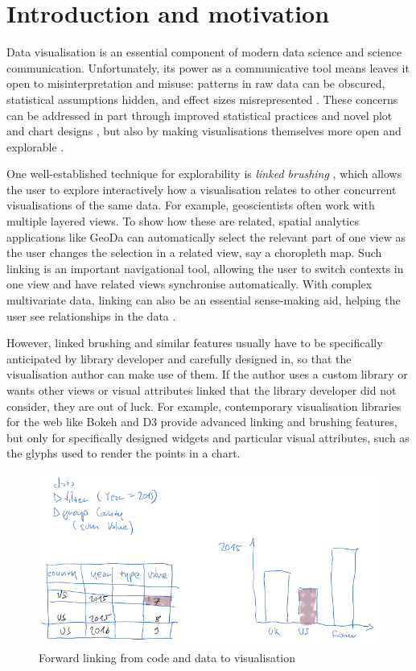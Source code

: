 \section{Introduction and motivation}

Data visualisation is an essential component of modern data science and science
communication. Unfortunately, its power as a communicative tool means leaves it
open to misinterpretation and misuse: patterns in raw data can be obscured,
statistical assumptions hidden, and effect sizes misrepresented
\cite{weissgerber15}. These concerns can be addressed in part through improved
statistical practices and novel plot and chart designs \cite{allen19}, but also
by making visualisations themselves more open and explorable
\cite{dragicevic19}.

One well-established technique for explorability is \emph{linked brushing}
\cite{fisherkeller75,becker87,buja91}, which allows the user to explore
interactively how a visualisation relates to other concurrent visualisations of
the same data. For example, geoscientists often work with multiple layered
views. To show how these are related, spatial analytics applications like GeoDa
\cite{anselin06} can automatically select the relevant part of one view as the
user changes the selection in a related view, say a choropleth map. Such linking
is an important navigational tool, allowing the user to switch contexts in one
view and have related views synchronise automatically. With complex multivariate
data, linking can also be an essential sense-making aid, helping the user see
relationships in the data \cite{he18}.

However, linked brushing and similar features usually have to be specifically
anticipated by library developer and carefully designed in, so that the
visualisation author can make use of them. If the author uses a custom library
or wants other views or visual attributes linked that the library developer did
not consider, they are out of luck. For example, contemporary visualisation
libraries for the web like Bokeh \cite{jolly18} and D3 \cite{bostock11} provide
advanced linking and brushing features, but only for specifically designed
widgets and particular visual attributes, such as the glyphs used to render the
points in a chart.

\begin{figure}[h]
\includegraphics[scale=0.35]{image/chart-fwd}
\caption{Forward linking from code and data to visualisation}
\end{figure}

